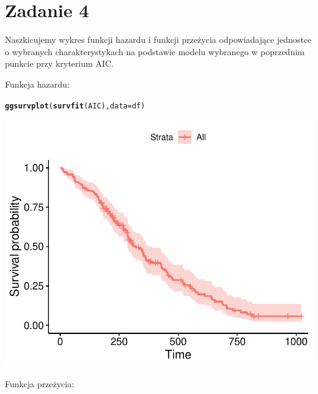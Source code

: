 \documentclass[12pt, a4paper]{article}\usepackage[]{graphicx}\usepackage[]{color}
\makeatletter
\def\maxwidth{ %
  \ifdim\Gin@nat@width>\linewidth
    \linewidth
  \else
    \Gin@nat@width
  \fi
}
\newcommand{\hlstd}[1]{\textcolor[rgb]{0.345,0.345,0.345}{#1}}%
\newcommand{\hlkwc}[1]{\textcolor[rgb]{0.333,0.667,0.333}{#1}}%
\newcommand{\hlkwd}[1]{\textcolor[rgb]{0.737,0.353,0.396}{\textbf{#1}}}%
\newenvironment{kframe}{%
 \def\at@end@of@kframe{}%
 \ifinner\ifhmode%
  \def\at@end@of@kframe{\end{minipage}}%
  \begin{minipage}{\columnwidth}%
 \fi\fi%
 \def\FrameCommand##1{\hskip\@totalleftmargin \hskip-\fboxsep
 \colorbox{shadecolor}{##1}\hskip-\fboxsep
     \hskip-\linewidth \hskip-\@totalleftmargin \hskip\columnwidth}%
 \MakeFramed {\advance\hsize-\width
   \@totalleftmargin\z@ \linewidth\hsize
   \@setminipage}}%
 {\par\unskip\endMakeFramed%
 \at@end@of@kframe}
\newenvironment{knitrout}{}{} %
\makeatother
\begin{document}
\section{Zadanie 4}

Naszkicujemy wykres funkcji hazardu i funkcji przeżycia odpowiadające jednostce o wybranych charakterystykach na podstawie modelu wybranego w poprzednim punkcie przy kryterium AIC.


Funkcja hazardu:

\begin{knitrout}
\color{fgcolor}\begin{kframe}
\begin{alltt}
\hlkwd{ggsurvplot}\hlstd{(}\hlkwd{survfit}\hlstd{(AIC),} \hlkwc{data} \hlstd{= df)}
\end{alltt}
\end{kframe}

{\centering \includegraphics[width=\maxwidth]{figure/unnamed-chunk-5-1} 

}


\end{knitrout}


Funkcja przeżycia:
\end{document}
